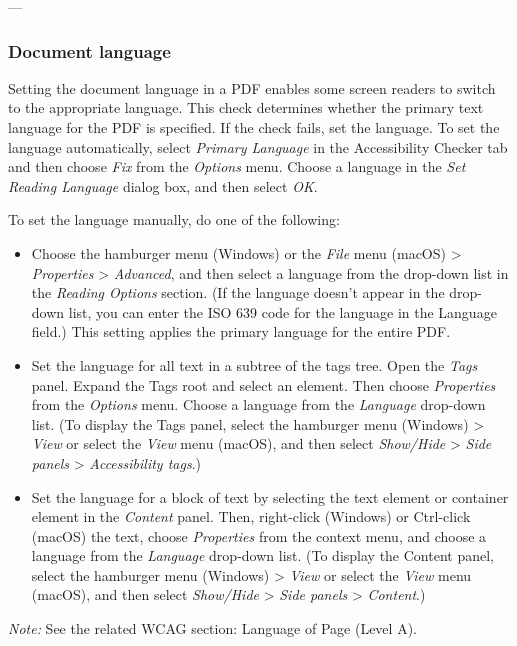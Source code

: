 ---

\subsubsection{Document language}
Setting the document language in a PDF enables some screen readers to switch to the appropriate language. This check determines whether the primary text language for the PDF is specified. If the check fails, set the language\footnotemark[1].
To set the language automatically, select \emph{Primary Language} in the Accessibility Checker tab and then choose \emph{Fix} from the \emph{Options} menu. Choose a language in the \emph{Set Reading Language} dialog box, and then select \emph{OK}.

To set the language manually, do one of the following:
\begin{itemize}
    \item Choose the hamburger menu (Windows) or the \emph{File} menu (macOS) > \emph{Properties} > \emph{Advanced}, and then select a language from the drop-down list in the \emph{Reading Options} section. (If the language doesn't appear in the drop-down list, you can enter the ISO 639 code for the language in the Language field.) This setting applies the primary language for the entire PDF.
    \item Set the language for all text in a subtree of the tags tree. Open the \emph{Tags} panel. Expand the Tags root and select an element. Then choose \emph{Properties} from the \emph{Options} menu. Choose a language from the \emph{Language} drop-down list. (To display the Tags panel, select the hamburger menu (Windows) > \emph{View} or select the \emph{View} menu (macOS), and then select \emph{Show/Hide} > \emph{Side panels} > \emph{Accessibility tags}.)
    \item Set the language for a block of text by selecting the text element or container element in the \emph{Content} panel. Then, right-click (Windows) or Ctrl-click (macOS) the text, choose \emph{Properties} from the context menu, and choose a language from the \emph{Language} drop-down list. (To display the Content panel, select the hamburger menu (Windows) > \emph{View} or select the \emph{View} menu (macOS), and then select \emph{Show/Hide} > \emph{Side panels} > \emph{Content}.)
\end{itemize}

\vspace{0.5em}
\noindent\textit{Note:} See the related WCAG section: Language of Page (Level A)\cite{WCAG}.


